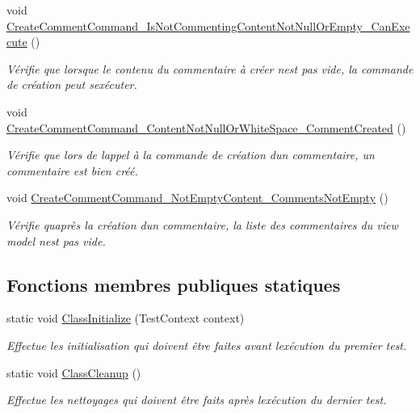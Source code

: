 \begin{DoxyCompactItemize}
void \hyperlink{class_boxes_1_1_tests_1_1_post_view_model_tests_a94bdadd1a2903529997031490078dcd6}{Create\+Comment\+Command\+\_\+\+Is\+Not\+Commenting\+Content\+Not\+Null\+Or\+Empty\+\_\+\+Can\+Execute} ()
\begin{DoxyCompactList}\small\item\em Vérifie que lorsque le contenu du commentaire à créer n\textquotesingle{}est pas vide, la commande de création peut s\textquotesingle{}exécuter. \end{DoxyCompactList}\item 
void \hyperlink{class_boxes_1_1_tests_1_1_post_view_model_tests_a94dab3e4aaea4c4ff88794de51449389}{Create\+Comment\+Command\+\_\+\+Content\+Not\+Null\+Or\+White\+Space\+\_\+\+Comment\+Created} ()
\begin{DoxyCompactList}\small\item\em Vérifie que lors de l\textquotesingle{}appel à la commande de création d\textquotesingle{}un commentaire, un commentaire est bien créé. \end{DoxyCompactList}\item 
void \hyperlink{class_boxes_1_1_tests_1_1_post_view_model_tests_a097d9590cc219e3222029be962c3d043}{Create\+Comment\+Command\+\_\+\+Not\+Empty\+Content\+\_\+\+Comments\+Not\+Empty} ()
\begin{DoxyCompactList}\small\item\em Vérifie qu\textquotesingle{}après la création d\textquotesingle{}un commentaire, la liste des commentaires du view model n\textquotesingle{}est pas vide. \end{DoxyCompactList}\end{DoxyCompactItemize}
\subsection*{Fonctions membres publiques statiques}
\begin{DoxyCompactItemize}
\item 
static void \hyperlink{class_boxes_1_1_tests_1_1_post_view_model_tests_a438c94ac014c7bef00c12769d5fb4f42}{Class\+Initialize} (Test\+Context context)
\begin{DoxyCompactList}\small\item\em Effectue les initialisation qui doivent être faites avant l\textquotesingle{}exécution du premier test. \end{DoxyCompactList}\item 
static void \hyperlink{class_boxes_1_1_tests_1_1_post_view_model_tests_ace3cd9aa4616a8932b3c55f56c933c84}{Class\+Cleanup} ()
\begin{DoxyCompactList}\small\item\em Effectue les nettoyages qui doivent être faits après l\textquotesingle{}exécution du dernier test. \end{DoxyCompactList}\end{DoxyCompactItemize}
